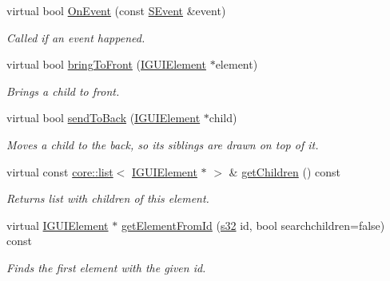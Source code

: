 \begin{DoxyCompactItemize}
\mbox{\label{classirr_1_1gui_1_1IGUIElement_a54b1799e21722d9e6ce5b8e4bdb2e80a}} 
virtual bool \hyperlink{classirr_1_1gui_1_1IGUIElement_a54b1799e21722d9e6ce5b8e4bdb2e80a}{On\+Event} (const \hyperlink{structirr_1_1SEvent}{S\+Event} \&event)
\begin{DoxyCompactList}\small\item\em Called if an event happened. \end{DoxyCompactList}\item 
virtual bool \hyperlink{classirr_1_1gui_1_1IGUIElement_ac262c8018bf4101f38f448fde16f5a52}{bring\+To\+Front} (\hyperlink{classirr_1_1gui_1_1IGUIElement}{I\+G\+U\+I\+Element} $\ast$element)
\begin{DoxyCompactList}\small\item\em Brings a child to front. \end{DoxyCompactList}\item 
virtual bool \hyperlink{classirr_1_1gui_1_1IGUIElement_a9b1880048e7542dbe289295de69e77cd}{send\+To\+Back} (\hyperlink{classirr_1_1gui_1_1IGUIElement}{I\+G\+U\+I\+Element} $\ast$child)
\begin{DoxyCompactList}\small\item\em Moves a child to the back, so it\textquotesingle{}s siblings are drawn on top of it. \end{DoxyCompactList}\item 
\mbox{\label{classirr_1_1gui_1_1IGUIElement_a96492ba4d7974c1eae92f98b31b70d95}} 
virtual const \hyperlink{classirr_1_1core_1_1list}{core\+::list}$<$ \hyperlink{classirr_1_1gui_1_1IGUIElement}{I\+G\+U\+I\+Element} $\ast$ $>$ \& \hyperlink{classirr_1_1gui_1_1IGUIElement_a96492ba4d7974c1eae92f98b31b70d95}{get\+Children} () const
\begin{DoxyCompactList}\small\item\em Returns list with children of this element. \end{DoxyCompactList}\item 
virtual \hyperlink{classirr_1_1gui_1_1IGUIElement}{I\+G\+U\+I\+Element} $\ast$ \hyperlink{classirr_1_1gui_1_1IGUIElement_ab79b8e81d2f2864312345cffe9237cce}{get\+Element\+From\+Id} (\hyperlink{namespaceirr_ac66849b7a6ed16e30ebede579f9b47c6}{s32} id, bool searchchildren=false) const
\begin{DoxyCompactList}\small\item\em Finds the first element with the given id. \end{DoxyCompactList}\item 

\end{DoxyCompactItemize}
